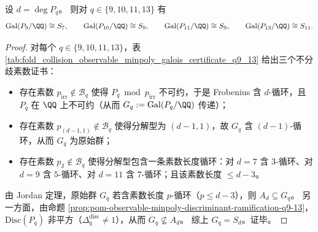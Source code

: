 \begin{proposition}[高阶递推的最大伽罗瓦群：\texorpdfstring{$\mathrm{Gal}(P_q/\QQ)\cong S_d$}{Gal(Pq/Q)=Sd}（\(q=9,10,11,13\)，可审计）]\label{prop:pom-observable-minpoly-galois-sd-q9-13}
设 \(d=\deg P_q\)。
则对 \(q\in\{9,10,11,13\}\) 有
\[
\mathrm{Gal}(P_9/\QQ)\cong S_7,\qquad
\mathrm{Gal}(P_{10}/\QQ)\cong S_9,\qquad
\mathrm{Gal}(P_{11}/\QQ)\cong S_9,\qquad
\mathrm{Gal}(P_{13}/\QQ)\cong S_{11}.
\]
\end{proposition}
\begin{proof}
对每个 \(q\in\{9,10,11,13\}\)，表 \ref{tab:fold_collision_observable_minpoly_galois_certificate_q9_13} 给出三个不分歧素数证书：
\begin{itemize}
  \item 存在素数 \(p_{\mathrm{irr}}\notin\mathcal{B}_q\) 使得 \(P_q\bmod p_{\mathrm{irr}}\) 不可约，于是 Frobenius 含 \(d\)-循环，且 \(P_q\) 在 \(\QQ\) 上不可约（从而 \(G_q:=\mathrm{Gal}(P_q/\QQ)\) 传递）；
  \item 存在素数 \(p_{(d-1,1)}\notin\mathcal{B}_q\) 使得分解型为 \((d-1,1)\)，故 \(G_q\) 含 \((d-1)\)-循环，从而 \(G_q\) 为原始群；
  \item 存在素数 \(p_{\mathrm{J}}\notin\mathcal{B}_q\) 使得分解型包含一条素数长度循环：对 \(d=7\) 含 \(3\)-循环、对 \(d=9\) 含 \(5\)-循环、对 \(d=11\) 含 \(7\)-循环；且该素数长度 \(\le d-3\)。
\end{itemize}
由 Jordan 定理，原始群 \(G_q\) 若含素数长度 \(p\)-循环（\(p\le d-3\)），则 \(A_d\subseteq G_q\)。
另一方面，由命题 \ref{prop:pom-observable-minpoly-discriminant-ramification-q9-13}，\(\mathrm{Disc}(P_q)\) 非平方（\(\Delta_q^{\mathrm{disc}}\neq 1\)），从而 \(G_q\not\subseteq A_d\)。
综上 \(G_q=S_d\)。证毕。
\end{proof}


